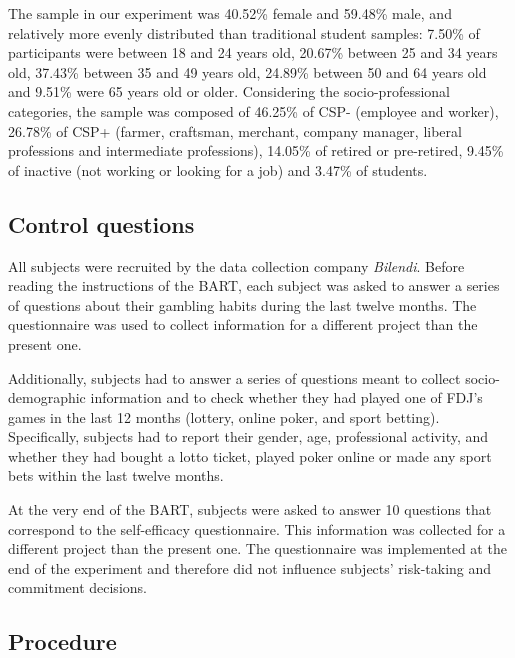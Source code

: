 \documentclass[
]{book}
\begin{document}
The sample in our experiment was 40.52\% female and 59.48\% male, and relatively more evenly distributed than traditional student samples:
7.50\% of participants were between 18 and 24 years old, 20.67\% between 25 and 34 years old, 37.43\% between 35 and 49 years old, 24.89\% between 50 and 64 years old and 9.51\% were 65 years old or older.
Considering the socio-professional categories, the sample was composed of 46.25\% of CSP- (employee and worker), 26.78\% of CSP+ (farmer, craftsman, merchant, company manager, liberal professions and intermediate professions), 14.05\% of retired or pre-retired, 9.45\% of inactive (not working or looking for a job) and 3.47\% of students.

\hypertarget{control-questions}{%
\subsection{Control questions}\label{control-questions}}

All subjects were recruited by the data collection company \emph{Bilendi}.
Before reading the instructions of the BART, each subject was asked to answer a series of questions about their gambling habits during the last twelve months.
The questionnaire was used to collect information for a different project than the present one.

Additionally, subjects had to answer a series of questions meant to collect socio-demographic information and to check whether they had played one of FDJ's games in the last 12 months (lottery, online poker, and sport betting). Specifically, subjects had to report their gender, age, professional activity, and whether they had bought a lotto ticket, played poker online or made any sport bets within the last twelve months.

At the very end of the BART, subjects were asked to answer 10 questions that correspond to the self-efficacy questionnaire.
This information was collected for a different project than the present one.
The questionnaire was implemented at the end of the experiment and therefore did not influence subjects' risk-taking and commitment decisions.

\hypertarget{procedure}{%
\subsection{Procedure}\label{procedure}}
\end{document}
